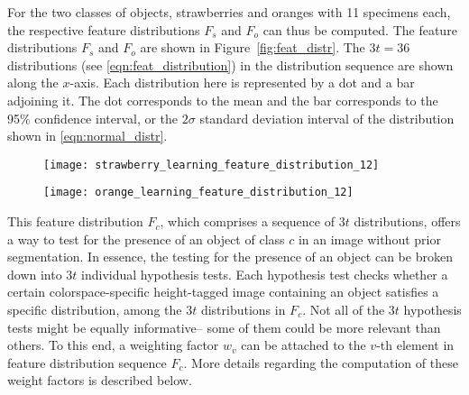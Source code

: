 For the two classes of objects, strawberries and oranges with 11 specimens each, the respective feature distributions $F_s$ and $F_o$ can thus be computed. The feature distributions $F_s$ and $F_o$ are shown in Figure~\ref{fig:feat_distr}. The $3t=36$ distributions (see \eqref{eqn:feat_distribution}) in the distribution sequence are shown along the $x$-axis. Each distribution here is represented by a dot and a bar adjoining it. The dot corresponds to the mean and the bar corresponds to the 95\% confidence interval, or the $2\sigma$ standard deviation interval of the distribution shown in \eqref{eqn:normal_distr}.
%
\begin{figure*}
  \centering
  \begin{subfigure}[]{0.8\textwidth}
      \texttt{[image: strawberry\_learning\_feature\_distribution\_12]}
      \caption{}
      \label{fig:feat_distr_strawberry}
  \end{subfigure}
  \begin{subfigure}[]{0.8\textwidth}
      \texttt{[image: orange\_learning\_feature\_distribution\_12]}
      \caption{}
      \label{fig:feat_distr_orange}
  \end{subfigure}
\caption[Feature distribution]{Strawberry feature distribution sequence $F_s$ () and orange feature distribution sequence $F_o$ () generated from 11 strawberry specimens and 11 orange specimens. All $3t=36$ distributions indexed by $v$ are shown along the $x$-axis. The  mean of each distribution is shown as a dot along with the 95\% confidence interval shown as a bar.}
\label{fig:feat_distr}
\end{figure*}	
%

This feature distribution $F_c$, which comprises a sequence of $3t$ distributions, offers a way to test for the presence of an object of class $c$ in an image without prior segmentation. In essence, the testing for the presence of an object can be broken down into $3t$ individual hypothesis tests. Each hypothesis test checks whether a certain colorspace-specific height-tagged image containing an object satisfies a specific distribution, among the $3t$ distributions in $F_c$. Not all of the $3t$ hypothesis tests might be equally informative-- some of them could be more relevant than others. To this end, a weighting factor $w_{v}$ can be attached to the $v$-th element in feature distribution sequence $F_c$.  More details regarding the computation of these weight factors is described below.

